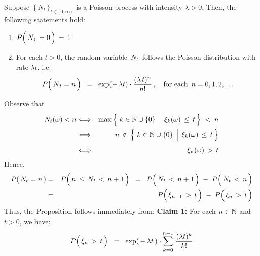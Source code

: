 \vskip 0.5cm
\begin{proposition}
\mbox{}
\vskip 0.15cm
\noindent
Suppose \,$\{\,N_{t}\,\}_{t\in[\,0,\infty)}$\, is a Poisson process with intensity $\lambda > 0$.
Then, the following statements hold:
\begin{enumerate}
\item
	$P\!\left(\,\overset{{\color{white}.}}{N}_{0} = 0\,\right)\,=\,1$.
\item
	For each $t > 0$, the random variable \,$N_{t}$\,
	follows the Poisson distribution with rate $\lambda t$, i.e.
	\begin{equation*}
	P\!\left(\,\overset{{\color{white}.}}{N}_{t} = n\,\right)
	\;\; = \;\;
		\exp(-\,\lambda t)\cdot\dfrac{(\lambda\,t)^{n}}{n!}\,,
	\quad
	\textnormal{for each \,$n = 0, 1, 2, \ldots$}
	\end{equation*}
\end{enumerate}
\end{proposition}
\proof
Observe that
\begin{eqnarray*}
N_{t}(\omega) < n
& \Longleftrightarrow &
	\max\left\{\,\left.
		k \overset{{\color{white}.}}{\in} \N\cup\{0\}
		\,\;\right\vert\;
		\xi_{k}(\omega) \,\leq\, t
		\,\right\}
	\;<\; n
\\
& \Longleftrightarrow &
	n \,\notin\,
	\left\{\,\left.
		k \overset{{\color{white}.}}{\in} \N\cup\{0\}
		\,\;\right\vert\;
		\xi_{k}(\omega) \,\leq\, t
		\,\right\}
\\
& \overset{{\color{white}1}}{\Longleftrightarrow} &
	\xi_{n}(\omega) \,>\, t
\end{eqnarray*}
Hence,
\begin{eqnarray*}
P\!\left(\,N_{t} = n\,\right)
& = &
	P\!\left(\,n \,\overset{{\color{white}.}}{\leq}\, N_{t} \,<\, n+1\,\right)
\;\; = \;\;
	P\!\left(\, N_{t} \,\overset{{\color{white}.}}{<}\, n+1 \,\right)
	\; - \;
	P\!\left(\, N_{t} \,\overset{{\color{white}.}}{<}\, n \,\right)
\\
& = &
	P\!\left(\, \xi_{n+1} \,\overset{{\color{white}.}}{>}\, t \,\right)
	\; - \;
	P\!\left(\, \xi_{n} \,\overset{{\color{white}.}}{>}\, t \,\right)
\end{eqnarray*}
Thus, the Proposition follows immediately from:
\vskip 0.5cm
\noindent
\textbf{Claim 1:}\quad
For each $n \in \mathbb{N}$ and $t > 0$, we have:
\begin{equation*}
P\!\left(\, \xi_{n} \,\overset{{\color{white}.}}{>}\, t \,\right)
\;\; = \;\;
	\exp(\,-\,\lambda t\,)
	\cdot
	\overset{n-1}{\underset{k=0}{\sum}}\;
	\dfrac{(\lambda t)^{k}}{k!}
\end{equation*}
